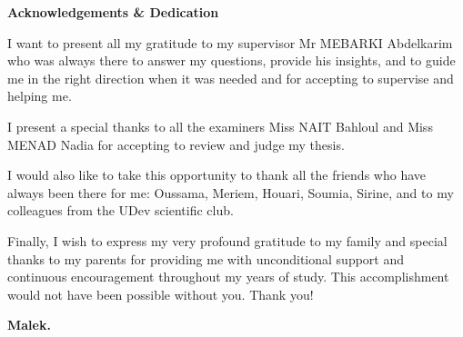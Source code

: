 \newenvironment{acknowledgement}{
  \vspace*{\fill}
  \begin{center}%
    \bfseries Acknowledgements \& Dedication
  \end{center}}%
  {\vfill}
  
  \thispagestyle{empty}
  
\begin{acknowledgement}

    I want to present all my gratitude to my supervisor Mr MEBARKI Abdelkarim who was always there to answer my questions, provide his insights, and to  guide me in the right direction when it was needed and for accepting to supervise and helping me. 
    
    I present a special thanks to all the examiners Miss NAIT Bahloul and Miss MENAD Nadia for accepting to review and judge my thesis.
 
    I would also like to take this opportunity to thank all the friends who have always been there for me: Oussama, Meriem, Houari, Soumia, Sirine, and to my colleagues from the UDev scientific club.
 
    Finally, I wish to express my very profound gratitude to my family and special thanks to my parents for providing me with unconditional support and continuous encouragement throughout my years of study. This accomplishment would not have been possible without you. Thank you!



\begin{flushright}
\textbf{Malek.}
\end{flushright}
\end{acknowledgement}

\clearpage